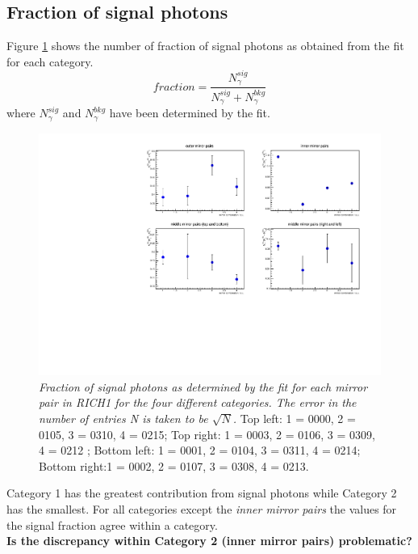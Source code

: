\subsection{Fraction of signal photons}
\label{sub:rich1frac}
Figure \ref{fig:rich1sigfrac} shows the number of fraction of signal photons as obtained from the fit for each category.
\begin{equation}
fraction = \frac{N^{sig}_{\gamma}}{N^{sig}_{\gamma} + N^{bkg}_{\gamma}}
\end{equation}
where $N^{sig}_{\gamma}$ and $N^{bkg}_{\gamma}$ have been determined by the fit.\\
\begin{figure}[!h]
	\vspace*{-0.cm}
	\begin{center}
		\includegraphics[width=1.\textwidth]{sigfrac_rich1.pdf}
		\vspace*{-1.5cm}
	\end{center}
	\caption{\textit{Fraction of signal photons as determined by the fit for each mirror pair in RICH1 for the four different categories. The error in the number of entries N is taken to be $\sqrt{N}$.} Top left: 1 = 0000, 2 = 0105, 3 = 0310, 4 = 0215; Top right: 1 = 0003, 2 = 0106, 3 = 0309, 4 = 0212 ; Bottom left: 1 = 0001, 2 = 0104, 3 = 0311, 4 = 0214; Bottom right:1 = 0002, 2 = 0107, 3 = 0308, 4 = 0213. }
	\label{fig:rich1sigfrac}
\end{figure}

Category 1 has the greatest contribution from signal photons while Category 2 has the smallest. For all categories except the \textit{inner mirror pairs} the values for the signal fraction agree within a category.\\
\textbf{Is the discrepancy within Category 2 (inner mirror pairs) problematic?}
\newpage




